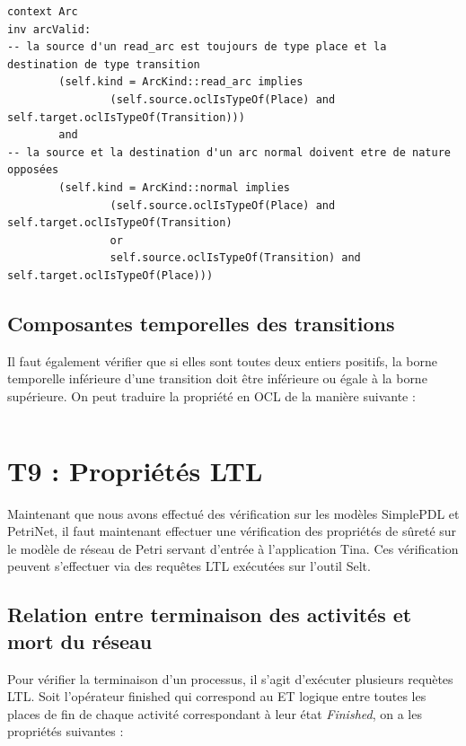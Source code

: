 \documentclass{report}
\begin{document}
\begin{verbatim}
context Arc
inv arcValid:
-- la source d'un read_arc est toujours de type place et la destination de type transition
        (self.kind = ArcKind::read_arc implies 
                (self.source.oclIsTypeOf(Place) and self.target.oclIsTypeOf(Transition)))
        and 
-- la source et la destination d'un arc normal doivent etre de nature opposées 
        (self.kind = ArcKind::normal implies 
                (self.source.oclIsTypeOf(Place) and self.target.oclIsTypeOf(Transition)
                or
                self.source.oclIsTypeOf(Transition) and self.target.oclIsTypeOf(Place)))
\end{verbatim}

\subsection{Composantes temporelles des transitions}

Il faut également vérifier que si elles sont toutes deux entiers positifs, la borne temporelle inférieure d'une transition doit être inférieure ou égale à la borne supérieure. On peut traduire la propriété en OCL de la manière suivante :

\begin{verbatim}
\end{verbatim}

\section{T9 : Propriétés LTL}

Maintenant que nous avons effectué des vérification sur les modèles SimplePDL et PetriNet, il faut maintenant effectuer une vérification des propriétés de sûreté sur le modèle de réseau de Petri servant d'entrée à l'application Tina. Ces vérification peuvent s'effectuer via des requêtes LTL exécutées sur l'outil Selt.

\subsection{Relation entre terminaison des activités et mort du réseau}

Pour vérifier la terminaison d'un processus, il s'agit d'exécuter plusieurs requètes LTL.
Soit l'opérateur finished qui correspond au ET logique entre toutes les places de fin de chaque activité correspondant à leur état \textit{Finished}, on a les propriétés suivantes :\\
\end{document}
